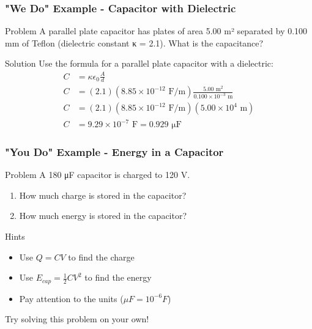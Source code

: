 \documentclass{beamer}
\begin{document}
\begin{frame}
    \frametitle{"We Do" Example - Capacitor with Dielectric}
    
    \begin{block}{Problem}
        A parallel plate capacitor has plates of area 5.00 m² separated by 0.100 mm of Teflon (dielectric constant κ = 2.1). What is the capacitance?
    \end{block}
    
    \begin{block}{Solution}
        Use the formula for a parallel plate capacitor with a dielectric:
        \begin{align}
            C &= \kappa\epsilon_0 \frac{A}{d} \\
            C &= (2.1)(8.85 \times 10^{-12} \text{ F/m})\frac{5.00 \text{ m}^2}{0.100 \times 10^{-3} \text{ m}} \\
            C &= (2.1)(8.85 \times 10^{-12} \text{ F/m})(5.00 \times 10^4 \text{ m}) \\
            C &= 9.29 \times 10^{-7} \text{ F} = 0.929 \text{ μF}
        \end{align}
    \end{block}
\end{frame}

\begin{frame}
    \frametitle{"You Do" Example - Energy in a Capacitor}
    
    \begin{block}{Problem}
        A 180 μF capacitor is charged to 120 V. 
        \begin{enumerate}
            \item How much charge is stored in the capacitor?
            \item How much energy is stored in the capacitor?
        \end{enumerate}
    \end{block}
    
    \begin{block}{Hints}
        \begin{itemize}
            \item Use $Q = CV$ to find the charge
            \item Use $E_{cap} = \frac{1}{2}CV^2$ to find the energy
            \item Pay attention to the units ($μF = 10^{-6} F$)
        \end{itemize}
    \end{block}
    
    Try solving this problem on your own!
\end{frame}
\end{document}
